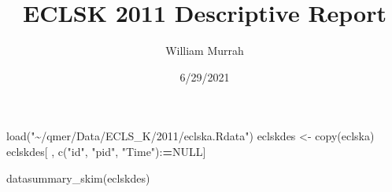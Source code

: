 \documentclass[
]{article}
\title{ECLSK 2011 Descriptive Report}
\author{William Murrah}
\date{6/29/2021}
\newenvironment{Shaded}{\begin{snugshade}}{\end{snugshade}}
\newcommand{\ConstantTok}[1]{\textcolor[rgb]{0.00,0.00,0.00}{#1}}
\newcommand{\ErrorTok}[1]{\textcolor[rgb]{0.64,0.00,0.00}{\textbf{#1}}}
\newcommand{\FunctionTok}[1]{\textcolor[rgb]{0.00,0.00,0.00}{#1}}
\newcommand{\NormalTok}[1]{#1}
\newcommand{\OtherTok}[1]{\textcolor[rgb]{0.56,0.35,0.01}{#1}}
\newcommand{\SpecialCharTok}[1]{\textcolor[rgb]{0.00,0.00,0.00}{#1}}
\newcommand{\StringTok}[1]{\textcolor[rgb]{0.31,0.60,0.02}{#1}}
\begin{document}
\maketitle

\begin{Shaded}
\begin{Highlighting}[]
\FunctionTok{load}\NormalTok{(}\StringTok{"\textasciitilde{}/qmer/Data/ECLS\_K/2011/eclska.Rdata"}\NormalTok{)}
\NormalTok{eclskdes }\OtherTok{\textless{}{-}} \FunctionTok{copy}\NormalTok{(eclska)}
\NormalTok{eclskdes[ , }\FunctionTok{c}\NormalTok{(}\StringTok{"id"}\NormalTok{, }\StringTok{"pid"}\NormalTok{, }\StringTok{"Time"}\NormalTok{)}\SpecialCharTok{:}\ErrorTok{=}\ConstantTok{NULL}\NormalTok{]}
\end{Highlighting}
\end{Shaded}

\begin{Shaded}
\begin{Highlighting}[]
\FunctionTok{datasummary\_skim}\NormalTok{(eclskdes)}
\end{Highlighting}
\end{Shaded}
\end{document}
